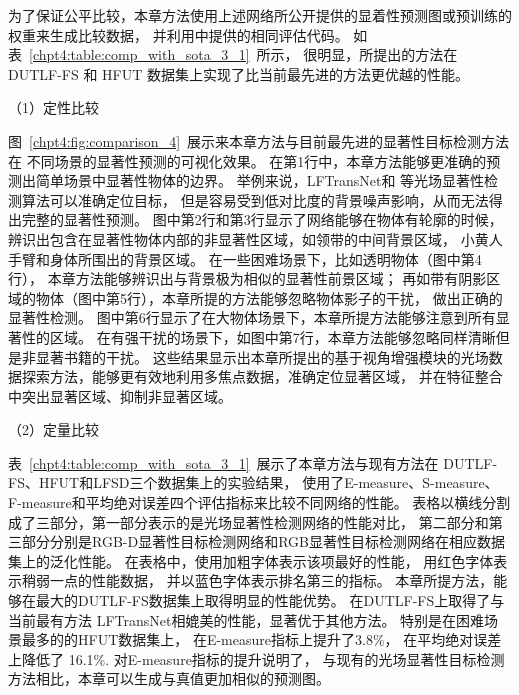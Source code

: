为了保证公平比较，本章方法使用上述网络所公开提供的显着性预测图或预训练的权重来生成比较数据，
并利用中提供的相同评估代码。 
如表~\ref{chpt4:table:comp_with_sota_3_1}~所示，
很明显，所提出的方法在 DUTLF-FS 和 HFUT 数据集上实现了比当前最先进的方法更优越的性能。




（1）定性比较

图~\ref{chpt4:fig:comparison_4}~展示来本章方法与目前最先进的显著性目标检测方法在
不同场景的显著性预测的可视化效果。
在第1行中，本章方法能够更准确的预测出简单场景中显著性物体的边界。
举例来说，LFTransNet和
等光场显著性检测算法可以准确定位目标，
但是容易受到低对比度的背景噪声影响，从而无法得出完整的显著性预测。
图中第2行和第3行显示了网络能够在物体有轮廓的时候，
辨识出包含在显著性物体内部的非显著性区域，如领带的中间背景区域，
小黄人手臂和身体所围出的背景区域。
在一些困难场景下，比如透明物体（图中第4行），
本章方法能够辨识出与背景极为相似的显著性前景区域；
再如带有阴影区域的物体（图中第5行），本章所提的方法能够忽略物体影子的干扰，
做出正确的显著性检测。
图中第6行显示了在大物体场景下，本章所提方法能够注意到所有显著性的区域。
在有强干扰的场景下，如图中第7行，本章方法能够忽略同样清晰但是非显著书籍的干扰。
这些结果显示出本章所提出的基于视角增强模块的光场数据探索方法，能够更有效地利用多焦点数据，准确定位显著区域，
并在特征整合中突出显著区域、抑制非显著区域。


%
%
%
%




（2）定量比较

表~\ref{chpt4:table:comp_with_sota_3_1}~展示了本章方法与现有方法在
DUTLF-FS、HFUT和LFSD三个数据集上的实验结果，
使用了E-measure、S-measure、F-measure和平均绝对误差四个评估指标来比较不同网络的性能。
表格以横线分割成了三部分，第一部分表示的是光场显著性检测网络的性能对比，
第二部分和第三部分分别是RGB-D显著性目标检测网络和RGB显著性目标检测网络在相应数据集上的泛化性能。
在表格中，使用加粗字体表示该项最好的性能，
用红色字体表示稍弱一点的性能数据，
并以蓝色字体表示排名第三的指标。
本章所提方法，能够在最大的DUTLF-FS数据集上取得明显的性能优势。
在DUTLF-FS上取得了与当前最有方法
LFTransNet相媲美的性能，显著优于其他方法。
特别是在困难场景最多的的HFUT数据集上，
在E-measure指标上提升了3.8\%，
在平均绝对误差上降低了 16.1\%.
对E-measure指标的提升说明了，
与现有的光场显著性目标检测方法相比，本章可以生成与真值更加相似的预测图。







